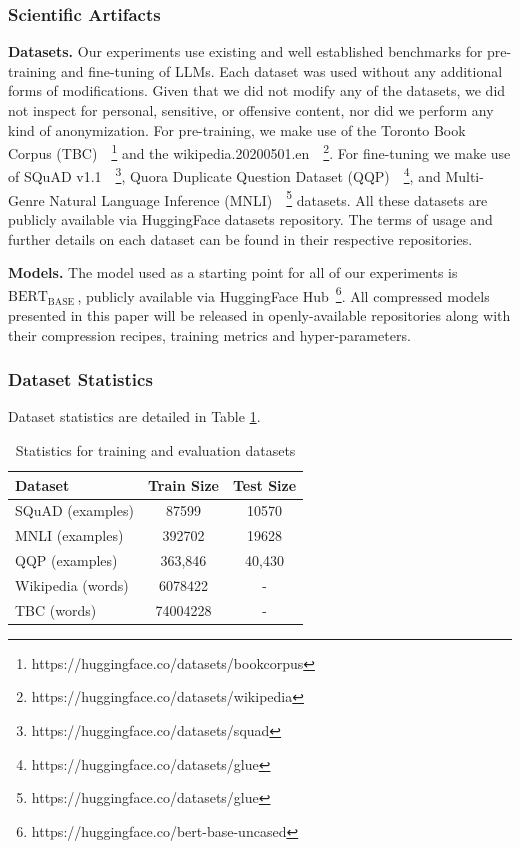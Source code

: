 \documentclass[11pt]{article}
\newcommand{\bert}{$\textrm{BERT}_{\textrm{BASE}}\,$}
\begin{document}
{\subsubsection{Scientific Artifacts}
\noindent\textbf{Datasets.} Our experiments use existing and well established benchmarks for pre-training and fine-tuning of LLMs. Each dataset was used without any additional forms of modifications. Given that we did not modify any of the datasets, we did not inspect for personal, sensitive, or offensive content, nor did we perform any kind of anonymization. For pre-training, we make use of the Toronto Book Corpus (TBC)~\cite{Zhu2015AligningBA}~\footnote{https://huggingface.co/datasets/bookcorpus} and the wikipedia.20200501.en~\cite{wikidump}~\footnote{https://huggingface.co/datasets/wikipedia}. For fine-tuning we make use of SQuAD v1.1~\cite{Rajpurkar2016SQuAD1Q}~\footnote{https://huggingface.co/datasets/squad}, Quora Duplicate Question Dataset (QQP)~\cite{Shankar2017IdentifyingQQ}~\footnote{ https://huggingface.co/datasets/glue}, and Multi-Genre Natural Language Inference (MNLI)~\cite{N18-1101}~\footnote{ https://huggingface.co/datasets/glue} datasets. All these datasets are publicly available via HuggingFace datasets repository. The terms of usage and further details on each dataset can be found in their respective repositories.

\noindent\textbf{Models.} The model used as a starting point for all of our experiments is \bert, publicly available via HuggingFace Hub~\footnote{https://huggingface.co/bert-base-uncased}. All compressed models presented in this paper will be released in openly-available repositories along with their compression recipes, training metrics and hyper-parameters.

\subsubsection{Dataset Statistics}
Dataset statistics are detailed in Table \ref{tab:dataset_stat}.
\begin{table}[!htb]
      \centering
         {\small 
             \begin{tabular}{l|c|c}
                \toprule 
                Dataset & Train Size & Test Size \\
                \midrule
                SQuAD (examples) &  87599 & 10570\\
                \midrule
                MNLI (examples) & 392702 & 19628 \\
                \midrule
                QQP (examples) &  363,846 & 40,430 \\
                \midrule
                Wikipedia (words) & 6078422  & - \\
                \midrule
                TBC (words) & 74004228 & - \\ 
                \bottomrule
            \end{tabular}
         }
     \caption{Statistics for training and evaluation datasets}
    \label{tab:dataset_stat}
\end{table}

}
\end{document}
